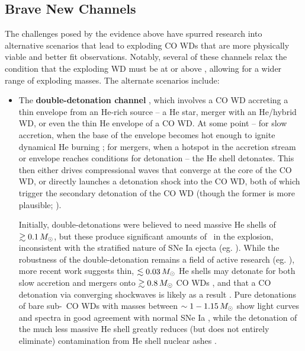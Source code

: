 \subsection{Brave New Channels}
\label{ssec:c1_new_typeia}

The challenges posed by the evidence above have spurred research into alternative scenarios that lead to exploding CO WDs that are more physically viable and better fit observations.  Notably, several of these channels relax the condition that the exploding WD must be at or above \Mch, allowing for a wider range of exploding masses.  The alternate scenarios include:

\begin{itemize}

	\item The {\bf double-detonation channel} \citep{livn90, woosw94}, which involves a CO WD accreting a thin envelope from an He-rich source -- a He star, merger with an He/hybrid WD, or even the thin He envelope of a CO WD.  At some point -- for slow accretion, when the base of the envelope becomes hot enough to ignite dynamical He burning \citep{woosk11}; for mergers, when a hotspot in the accretion stream or envelope reaches conditions for detonation \citep{guil+10, rask+12, pakm+13} -- the He shell detonates.  This then either drives compressional waves that converge at the core of the CO WD, or directly launches a detonation shock into the CO WD, both of which trigger the secondary detonation of the CO WD (though the former is more plausible; \citealt{mollw13}).  

Initially, double-detonations were believed to need massive He shells of $\gtrsim0.1\,\Msun$, but these produce significant amounts of \Ni\ in the explosion, inconsistent with the stratified nature of SNe Ia ejecta (eg. \citealt{krom+10,woosk11}).  While the robustness of the double-detonation remains a field of active research (eg. \citealt{woosk11, holc+13, shenm14, shenb14, dan+15}), more recent work suggests thin, $\lesssim0.03\,\Msun$ He shells may detonate for both slow accretion and mergers onto $\gtrsim0.8\,\Msun$ CO WDs \citep{woosk11, pakm+13, shenm14}, and that a CO detonation via converging shockwaves is likely as a result \citep{fink+10, mollw13, shenb14}.  Pure detonations of bare sub-\Mch\ CO WDs with masses between $\sim1-1.15\,\Msun$ show light curves and spectra in good agreement with normal SNe Ia \citep{shig+92, sim+10}, while the detonation of the much less massive He shell greatly reduces (but does not entirely eliminate) contamination from He shell nuclear ashes \citep{krom+10, hill+13}.


\end{itemize}
